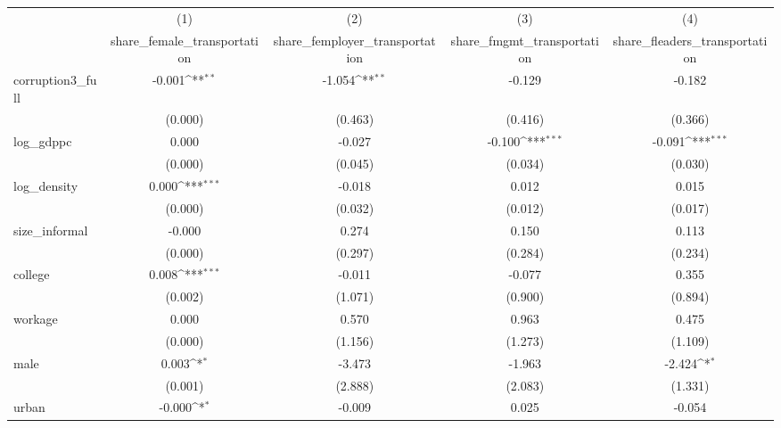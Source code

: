 {
\def\sym#1{\ifmmode^{#1}\else\(^{#1}\)\fi}
\begin{tabular}{l*{4}{c}}
\hline\hline
            &\multicolumn{1}{c}{(1)}&\multicolumn{1}{c}{(2)}&\multicolumn{1}{c}{(3)}&\multicolumn{1}{c}{(4)}\\
            &\multicolumn{1}{c}{share\_female\_transportation}&\multicolumn{1}{c}{share\_femployer\_transportation}&\multicolumn{1}{c}{share\_fmgmt\_transportation}&\multicolumn{1}{c}{share\_fleaders\_transportation}\\
\hline
corruption3\_full&      -0.001\sym{**} &      -1.054\sym{**} &      -0.129         &      -0.182         \\
            &     (0.000)         &     (0.463)         &     (0.416)         &     (0.366)         \\
[1em]
log\_gdppc   &       0.000         &      -0.027         &      -0.100\sym{***}&      -0.091\sym{***}\\
            &     (0.000)         &     (0.045)         &     (0.034)         &     (0.030)         \\
[1em]
log\_density &       0.000\sym{***}&      -0.018         &       0.012         &       0.015         \\
            &     (0.000)         &     (0.032)         &     (0.012)         &     (0.017)         \\
[1em]
size\_informal&      -0.000         &       0.274         &       0.150         &       0.113         \\
            &     (0.000)         &     (0.297)         &     (0.284)         &     (0.234)         \\
[1em]
college     &       0.008\sym{***}&      -0.011         &      -0.077         &       0.355         \\
            &     (0.002)         &     (1.071)         &     (0.900)         &     (0.894)         \\
[1em]
workage     &       0.000         &       0.570         &       0.963         &       0.475         \\
            &     (0.000)         &     (1.156)         &     (1.273)         &     (1.109)         \\
[1em]
male        &       0.003\sym{*}  &      -3.473         &      -1.963         &      -2.424\sym{*}  \\
            &     (0.001)         &     (2.888)         &     (2.083)         &     (1.331)         \\
[1em]
urban       &      -0.000\sym{*}  &      -0.009         &       0.025         &      -0.054         \\

\end{tabular}}
